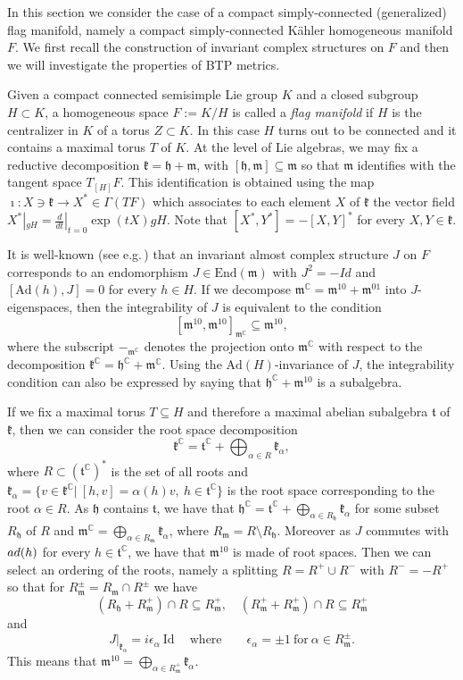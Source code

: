 \documentclass{amsart}
\numberwithin{equation}{section}
\theoremstyle{definition}
\renewcommand{\1}{\mathds{1}}
\renewcommand{\a}{\alpha}
\newcommand{\gk}{\mathfrak k}
\newcommand{\gh}{\mathfrak h}
\newcommand{\gm}{\mathfrak m}
\newcommand{\gt}{\mathfrak t}
\newcommand{\ad}{\rm {ad}}
\renewcommand{\>}{\rightarrow}
\begin{document}
In this section we consider the case of a compact simply-connected (generalized) flag manifold, namely a compact simply-connected K\"ahler homogeneous manifold $F$. We first recall the construction of invariant complex structures on $F$ and then we will investigate the   properties of {\rm BTP} metrics.  \par
Given a compact connected semisimple Lie group $K$ and a closed subgroup $H\subset K$, a homogeneous space $F:= K/H$ is called a {\it flag manifold} if $H$ is the centralizer in $K$ of a torus $Z\subset K$. In this case $H$ turns out to be connected and it contains a maximal torus $T$ of $K$. At the level of Lie algebras, we may fix a reductive decomposition $\gk = \gh + \gm$, with $[\gh,\gm]\subseteq \gm$ so that $\gm$ identifies with the tangent space $T_{[H]}F$. This identification is obtained using the map $\imath:X\ni\gk\to X^*\in\Gamma(TF)$ which associates to each element $X$ of $\gk$ the vector field $X^*|_{gH} = \frac{d}{dt}|_{t=0}\exp(tX)gH$. Note that $[X^*,Y^*]= - [X,Y]^*$ for every $X,Y\in \gk$.

It is well-known (see e.g.\,\cite{BFR}) that an invariant almost complex structure $J$ on $F$ corresponds to an endomorphism $J\in \mbox{End}(\gm)$ with $J^2=-Id$ and $[\mbox{Ad}(h),J]=0$ for every $h\in H$. If we decompose $\gm^{\mathbb C} = \gm^{10}+\gm^{01}$ into $J$-eigenspaces, then the integrability of $J$ is equivalent to the condition
$$[\gm^{10},\gm^{10}]_{\gm^{\mathbb C}}\subseteq \gm^{10},$$
where the subscript ${-}_{\gm^{\mathbb C}}$ denotes the projection onto $\gm^{\mathbb C}$ with respect to the decomposition $\gk^{\mathbb C} = \gh^{\mathbb C} + \gm^{\mathbb C}$. Using the $\mbox{Ad}(H)$-invariance of $J$, the integrability condition can also be expressed by saying that $\gh^{\mathbb C}+ \gm^{10}$ is a subalgebra.

If we fix a maximal torus $T\subseteq H$ and therefore a maximal abelian subalgebra $\gt$ of $\gk$, then we can consider the root space decomposition
$$\gk^{\mathbb C} = \gt^{\mathbb C} + \bigoplus_{\alpha\in R}\gk_\alpha,$$
where $R\subset(\gt^{\mathbb C})^*$ is the set of all roots and $\gk_\alpha = \{v\in \gk^{\mathbb C}|\ [h,v]=\alpha(h)v,\ h\in \gt^{\mathbb C}\}$ is the root space corresponding to the root $\alpha\in R$. As $\gh$ contains $\gt$, we have that $\gh^{\mathbb C} = \gt^{\mathbb C} + \bigoplus_{\alpha\in R_{\gh}}\gk_\alpha$ for some subset $R_\gh$ of $R$ and $\gm^{\mathbb C} = \bigoplus_{\alpha\in R_\gm}\gk_\alpha$, where $R_\gm = R\setminus R_{\gh}$. Moreover as $J$ commutes with $\ad(h)$ for every $h\in \gt^{\mathbb C}$, we have that $\gm^{10}$ is made of root spaces. Then we can select an ordering of the roots, namely a splitting $R = R^+ \cup R^-$ with $R^-= - R^+$ so that for $R_\gm^{\pm} = R_\gm \cap R^{\pm}$ we have
$$(R_\gh + R_\gm^+) \cap R \subseteq R_\gm^+,\quad (R_\gm^+ + R_\gm^+) \cap R \subseteq R_\gm^+$$
and
$$J|_{\gk_\alpha} =  i\epsilon_\a\ \mbox{Id}\ \quad \mbox{where}\qquad \epsilon_\a=\pm 1\ \mbox{for}\ \alpha\in R_\gm^{\pm}.$$
This means that $\gm^{10} = \bigoplus_{\alpha\in R_\gm^+} \gk_\alpha$.
\end{document}
